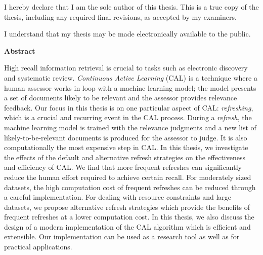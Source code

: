 \cleardoublepage %

 
  \noindent
I hereby declare that I am the sole author of this thesis. This is a true copy of the thesis, including any required final revisions, as accepted by my examiners.

  \bigskip
  
  \noindent
I understand that my thesis may be made electronically available to the public.

\cleardoublepage


\begin{center}\textbf{Abstract}\end{center}
High recall information retrieval is crucial to tasks such as electronic
discovery and systematic review. \textit{Continuous Active Learning} (CAL) is a
technique where a human assessor works in loop with a machine learning model; the
model presents a set of documents likely to be relevant and the assessor
provides relevance feedback. Our focus in this thesis is on one particular aspect
of CAL:  \textit{refreshing}, which is a crucial and recurring event in the CAL
process.  During a \textit{refresh}, the machine learning model is trained with
the relevance judgments and a new list of likely-to-be-relevant documents is
produced for the assessor to judge. It is also computationally the most
expensive step in CAL. In this thesis, we investigate the effects of the default
and alternative refresh strategies on the effectiveness and efficiency of CAL.
We find that more frequent refreshes can significantly reduce the human effort
required to achieve certain recall. For moderately sized datasets, the high
computation cost of frequent refreshes can be reduced through a careful
implementation. For dealing with resource constraints and large datasets, we
propose alternative refresh strategies which provide the benefits of frequent
refreshes at a lower computation cost.
In this thesis, we also discuss the design of a modern implementation of the CAL
algorithm which is efficient and extensible. Our implementation can be used as a
research tool as well as for practical applications.

